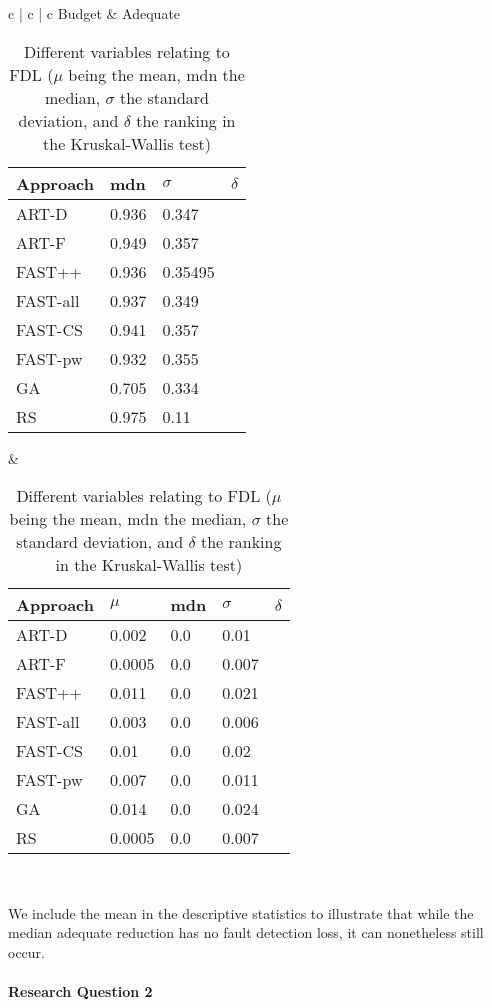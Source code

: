 \begin{table}[htpb]
	\caption[FDL statistical results]{Different variables relating to FDL ($\mu$ being the mean, mdn the median, $\sigma$ the standard deviation, and $\delta$ the ranking in the Kruskal-Wallis test)}\label{tab:fdl_stats}
	\centering
	\begin{tabular}{c | c | c}
	\midrule
	Budget & Adequate \\
	\midrule
	{\begin{tabular}{l | l | l | l}
		Approach & mdn & $\sigma$ & $\delta$ \\
		\midrule
		ART-D & 0.936 & 0.347 & \\ \hline
		ART-F & 0.949 & 0.357 & \\ \hline
		FAST++ & 0.936 & 0.35495 & \\ \hline
		FAST-all & 0.937 & 0.349 & \\ \hline
		FAST-CS & 0.941 & 0.357 & \\ \hline
		FAST-pw & 0.932 & 0.355 & \\ \hline
		GA & 0.705 & 0.334 & \\ \hline
		RS & 0.975 & 0.11 & \\
	\end{tabular}} &
	{ \begin{tabular}{l | l | l | l | l}
		Approach & $\mu$ & mdn & $\sigma$ & $\delta$ \\
		\midrule
		ART-D & 0.002 & 0.0 & 0.01 \\ \hline
		ART-F & 0.0005 & 0.0 & 0.007 \\ \hline
		FAST++ & 0.011 & 0.0 & 0.021 \\ \hline
		FAST-all & 0.003 & 0.0 & 0.006 \\ \hline
		FAST-CS & 0.01 & 0.0 & 0.02 \\ \hline
		FAST-pw & 0.007 & 0.0 & 0.011 \\ \hline
		GA & 0.014 & 0.0 & 0.024 \\ \hline
		RS & 0.0005 & 0.0 & 0.007 \\
	\end{tabular}} \\
	\bottomrule
	\end{tabular}
\end{table}

We include the mean in the descriptive statistics to illustrate that
while the median adequate reduction has no fault detection loss, it can
nonetheless still occur.

\paragraph{Research Question 2}

